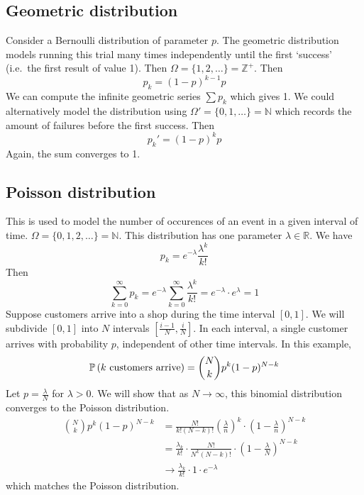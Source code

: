 \subsection{Geometric distribution}
Consider a Bernoulli distribution of parameter \(p\).
The geometric distribution models running this trial many times independently until the first `success' (i.e.\ the first result of value 1).
Then \(\Omega = \{ 1, 2, \dots \} = \mathbb Z^+\).
Then
\[
	p_k = (1-p)^{k-1}p
\]
We can compute the infinite geometric series \(\sum p_k\) which gives 1.
We could alternatively model the distribution using \(\Omega' = \{ 0, 1, \dots \} = \mathbb N\) which records the amount of failures before the first success.
Then
\[
	p_k' = (1-p)^k p
\]
Again, the sum converges to 1.

\subsection{Poisson distribution}
This is used to model the number of occurences of an event in a given interval of time.
\(\Omega = \{ 0, 1, 2, \dots \} = \mathbb N\).
This distribution has one parameter \(\lambda \in \mathbb R\).
We have
\[
	p_k = e^{-\lambda} \frac{\lambda^k}{k!}
\]
Then
\[
	\sum_{k=0}^\infty p_k = e^{-\lambda}  \sum_{k=0}^\infty \frac{\lambda^k}{k!} = e^{-\lambda} \cdot e^{\lambda} = 1
\]
Suppose customers arrive into a shop during the time interval \([0, 1]\).
We will subdivide \([0, 1]\) into \(N\) intervals \(\left[ \frac{i-1}{N}, \frac{i}{N} \right]\).
In each interval, a single customer arrives with probability \(p\), independent of other time intervals.
In this example,
\[
	\mathbb{P}\left({k \text{ customers arrive}}\right) = \binom{N}{k} p^k (1-p)^{N-k}
\]
Let \(p = \frac{\lambda}{N}\) for \(\lambda > 0\).
We will show that as \(N \to \infty\), this binomial distribution converges to the Poisson distribution.
\begin{align*}
	\binom{N}{k} p^k (1-p)^{N-k} & = \frac{N!}{k!(N-k)!} \left( \frac{\lambda}{n} \right)^k \cdot \left( 1 - \frac{\lambda}{n} \right)^{N-k} \\
	                             & = \frac{\lambda_k}{k!} \cdot \frac{N!}{N^k(N-k)!} \cdot \left( 1 - \frac{\lambda}{N} \right)^{N-k}        \\
	                             & \to \frac{\lambda_k}{k!} \cdot 1 \cdot e^{-\lambda}
\end{align*}
which matches the Poisson distribution.
